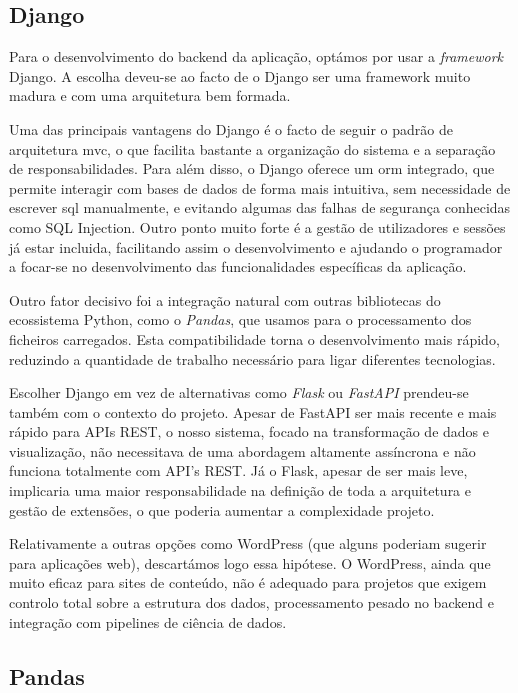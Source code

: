 \subsection{Django}

Para o desenvolvimento do backend da aplicação, optámos por usar a \textit{framework} Django. A escolha deveu-se ao facto  de o Django ser uma framework muito madura e com uma arquitetura bem formada.

Uma das principais vantagens do Django é o facto de seguir o padrão de arquitetura \gls{mvc}, o que facilita bastante a organização do sistema e a separação de responsabilidades. Para além disso, o Django oferece um \gls{orm} integrado, que permite interagir com bases de dados de forma mais intuitiva, sem necessidade de escrever \gls{sql} manualmente, e evitando algumas das falhas de segurança conhecidas como SQL Injection. Outro ponto muito forte é a gestão de utilizadores e sessões já estar incluida, facilitando assim o desenvolvimento e ajudando o programador a focar-se no desenvolvimento das funcionalidades específicas da aplicação.

Outro fator decisivo foi a integração natural com outras bibliotecas do ecossistema Python, como o \textit{Pandas}, que usamos para o processamento dos ficheiros carregados. Esta compatibilidade torna o desenvolvimento mais rápido, reduzindo a quantidade de trabalho necessário para ligar diferentes tecnologias.

Escolher Django em vez de alternativas como \textit{Flask} ou \textit{FastAPI} prendeu-se também com o contexto do projeto. Apesar de FastAPI ser mais recente e mais rápido para APIs REST, o nosso sistema, focado na transformação de dados e visualização, não necessitava de uma abordagem altamente assíncrona e não funciona totalmente com API's REST. Já o Flask, apesar de ser mais leve, implicaria uma maior responsabilidade na definição de toda a arquitetura e gestão de extensões, o que poderia aumentar a complexidade projeto.

Relativamente a outras opções como WordPress (que alguns poderiam sugerir para aplicações web), descartámos logo essa hipótese. O WordPress, ainda que muito eficaz para sites de conteúdo, não é adequado para projetos que exigem controlo total sobre a estrutura dos dados, processamento pesado no backend e integração com pipelines de ciência de dados.


\subsection{Pandas}

